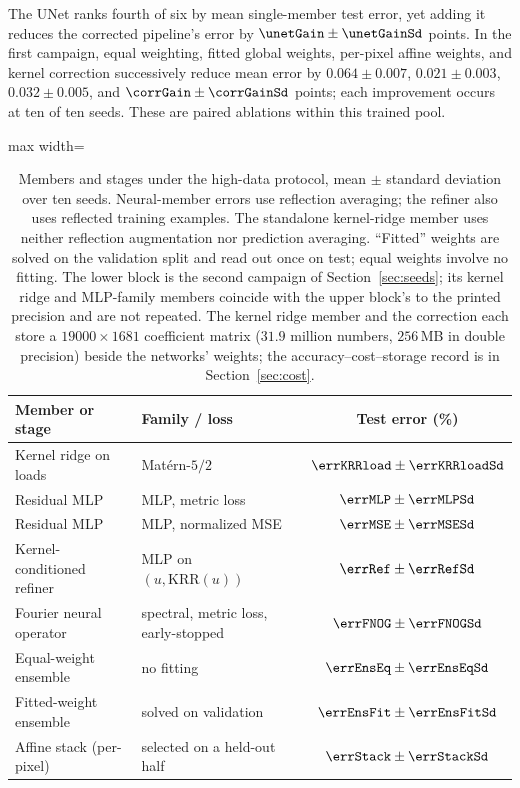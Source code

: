 The UNet ranks fourth of six by mean single-member test error, yet adding it reduces the corrected pipeline's error by $\unetGain\pm\unetGainSd$ points. In the first campaign, equal weighting, fitted global weights, per-pixel affine weights, and kernel correction successively reduce mean error by $0.064\pm0.007$, $0.021\pm0.003$, $0.032\pm0.005$, and $\corrGain\pm\corrGainSd$ points; each improvement occurs at ten of ten seeds. These are paired ablations within this trained pool.

\begin{table}[t]
\centering
\caption{Members and stages under the high-data protocol, mean $\pm$ standard
deviation over ten seeds. Neural-member errors use reflection averaging;
the refiner also uses reflected training examples. The standalone kernel-ridge
member uses neither reflection augmentation nor prediction averaging.
``Fitted'' weights are solved on the validation
split and read out once on test; equal weights involve no fitting. The lower
block is the second campaign of Section~\ref{sec:seeds}; its kernel ridge and
MLP-family members coincide with the upper block's to the printed precision
and are not repeated. The kernel ridge member and the correction each store
a $19000\times1681$ coefficient matrix ($31.9$ million numbers, $256$\,MB in
double precision) beside the networks' weights; the accuracy--cost--storage
record is in Section~\ref{sec:cost}.}
\label{tab:members}
\begin{adjustbox}{max width=\linewidth}
\begin{tabular}{llc}
\toprule
Member or stage & Family / loss & Test error (\%) \\
\midrule
Kernel ridge on loads & Mat\'ern-$5/2$ & $\errKRRload\pm\errKRRloadSd$ \\
Residual MLP & MLP, metric loss & $\errMLP\pm\errMLPSd$ \\
Residual MLP & MLP, normalized MSE & $\errMSE\pm\errMSESd$ \\
Kernel-conditioned refiner & MLP on $(u,\mathrm{KRR}(u))$ & $\errRef\pm\errRefSd$ \\
Fourier neural operator & spectral, metric loss, early-stopped & $\errFNOG\pm\errFNOGSd$ \\
\midrule
Equal-weight ensemble & no fitting & $\errEnsEq\pm\errEnsEqSd$ \\
Fitted-weight ensemble & solved on validation & $\errEnsFit\pm\errEnsFitSd$ \\
Affine stack (per-pixel) & selected on a held-out half & $\errStack\pm\errStackSd$ \\

\end{tabular}
\end{adjustbox}
\end{table}
